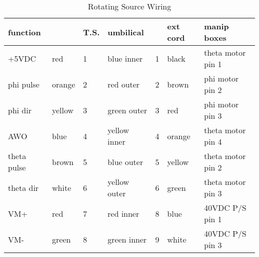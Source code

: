 \begin{table}[htb]
\begin{center}
\begin{tabular}{|l|l|l|l|l|l|l|}
\hline
function     &        & T.S. & umbilical &   & ext cord & manip boxes \\
\hline
+5VDC        & red    & 1 & blue inner   & 1 & black  & theta motor pin 1 \\
\hline
phi pulse    & orange & 2 & red outer    & 2 & brown  & phi motor pin 2 \\
\hline
phi dir      & yellow & 3 & green outer  & 3 & red    & phi motor pin 3 \\
\hline
AWO          & blue   & 4 & yellow inner & 4 & orange & theta motor pin 4 \\
\hline
theta pulse  & brown  & 5 & blue outer   & 5 & yellow & theta motor pin 2 \\
\hline
theta dir    & white  & 6 & yellow outer & 6 & green  & theta motor pin 3 \\
\hline
VM+          & red    & 7 & red inner    & 8 & blue   & 40VDC P/S pin 1 \\
\hline
VM-          & green  & 8 & green inner  & 9 & white  & 40VDC P/S pin 3 \\
\hline
\end{tabular}
\caption[Rotating Source Wiring]
        {Rotating Source Wiring
        }
\end{center}
\end{table}
  


